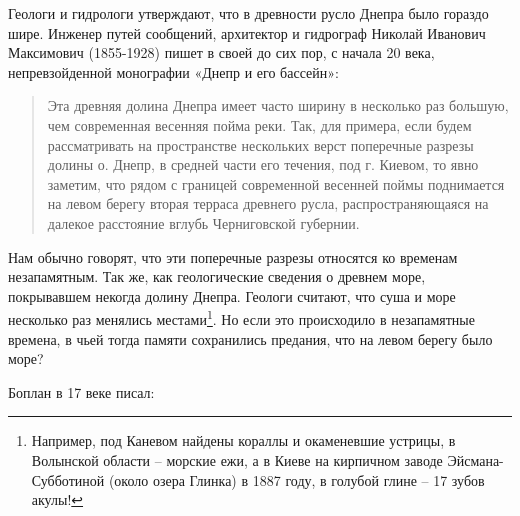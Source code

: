 Геологи и гидрологи утверждают, что в древности русло Днепра было гораздо шире. Инженер путей сообщений, архитектор и гидрограф Николай Иванович Максимович (1855-1928) пишет в своей до сих пор, с начала 20 века, непревзойденной монографии «Днепр и его бассейн»\cite{maxdnepr01}:

\begin{quotation}
Эта древняя долина Днепра имеет часто ширину в несколько раз большую, чем современная весенняя пойма реки. Так, для примера, если будем рассматривать на пространстве нескольких верст поперечные разрезы долины о. Днепр, в средней части его течения, под г. Киевом, то явно заметим, что рядом с границей современной весенней поймы поднимается на левом берегу вторая терраса древнего русла, распространяющаяся на далекое расстояние вглубь Черниговской губернии.
\end{quotation}

Нам обычно говорят, что эти поперечные разрезы относятся ко временам незапамятным. Так же, как геологические сведения о древнем море, покрывавшем некогда долину Днепра. Геологи считают, что суша и море несколько раз менялись местами\footnote{Например, под Каневом найдены кораллы и окаменевшие устрицы, в Волынской области – морские ежи, а в Киеве на кирпичном заводе Эйсмана-Субботиной (около озера Глинка) в 1887 году, в голубой глине – 17 зубов акулы!\cite{arhsved01}}. Но если это происходило в незапамятные времена, в чьей тогда памяти сохранились предания, что на левом берегу было море?

Боплан в 17 веке писал\cite{boplan01}:

